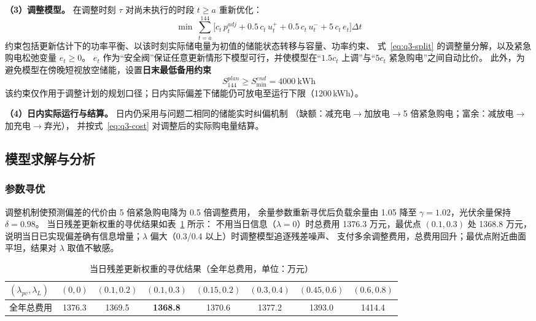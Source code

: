\textbf{（3）调整模型。} 在调整时刻 $\tau$ 对尚未执行的时段 $t\ge a$ 重新优化：
\begin{equation}
\min\ \sum_{t=a}^{144}\Big[c_t\,p^{adj}_t+0.5\,c_t\,u^{+}_t+0.5\,c_t\,u^{-}_t+5\,c_t\,e_t\Big]\Delta t
\label{eq:q3-adjlp}
\end{equation}
约束包括更新估计下的功率平衡、以该时刻实际储电量为初值的储能状态转移与容量、功率约束、
式~\eqref{eq:q3-split} 的调整量分解，以及紧急购电松弛变量 $e_t\ge0$。
$e_t$ 作为“安全阀”保证任意更新情形下模型可行，并使模型在“$1.5c_t$ 上调”与“$5c_t$ 紧急购电”之间自动比价。
此外，为避免模型在傍晚短视放空储能，设置\textbf{日末最低备用约束}
\begin{equation}
S^{plan}_{144}\ge S^{end}_{\min}=4000\ \text{kWh}
\label{eq:q3-end}
\end{equation}
该约束仅作用于调整计划的规划口径；日内实际偏差下储能仍可放电至运行下限（1200\,kWh）。

\textbf{（4）日内实际运行与结算。} 日内仍采用与问题二相同的储能实时纠偏机制
（缺额：减充电$\to$加放电$\to$5 倍紧急购电；富余：减放电$\to$加充电$\to$弃光），
并按式~\eqref{eq:q3-cost} 对调整后的实际购电量结算。

\subsection{模型求解与分析}

\subsubsection{参数寻优}
\label{sec:q3-param}
调整机制使预测偏差的代价由 5 倍紧急购电降为 0.5 倍调整费用，
余量参数重新寻优后负载余量由 1.05 降至 $\gamma=1.02$，光伏余量保持 $\delta=0.98$。
当日残差更新权重的寻优结果如表~\ref{tab:q3-lambda} 所示：
不用当日信息（$\lambda=0$）时总费用 1376.3 万元，最优点 $(0.1,0.3)$ 处 1368.8 万元，
说明当日已实现偏差确有信息增量；$\lambda$ 偏大（0.3/0.4 以上）时调整模型追逐残差噪声、
支付多余调整费用，总费用回升；最优点附近曲面平坦，结果对 $\lambda$ 取值不敏感。

\begin{table}[!htbp]
\caption{当日残差更新权重的寻优结果（全年总费用，单位：万元）}\label{tab:q3-lambda}
\centering
\small
\begin{tabular}{lccccccc}
\toprule
$(\lambda_{pv},\lambda_L)$ & $(0,0)$ & $(0.1,0.2)$ & $(0.1,0.3)$ & $(0.15,0.2)$ & $(0.3,0.4)$ & $(0.45,0.6)$ & $(0.6,0.8)$ \\
\midrule
全年总费用 & 1376.3 & 1369.5 & \textbf{1368.8} & 1370.6 & 1377.2 & 1393.0 & 1414.4 \\
\bottomrule
\end{tabular}
\end{table}

